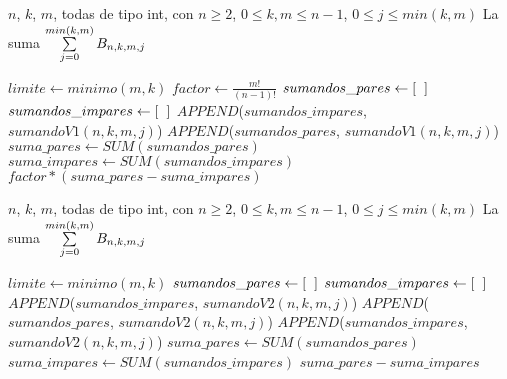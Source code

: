 \begin{algorithm}
\caption{$sumatoriaV1$}\label{alg: sumatoriaV1}
\begin{algorithmic} [1]
\REQUIRE $n$, $k$, $m$, todas de tipo int, con $n \geq 2$, 
$0 \leq k, m \leq n-1$, $0 \leq j \leq min(k,m)$
\ENSURE La suma $\sum\limits_{j=0}^{min(k,m)}B_{n, k, m, j}$

\STATE $limite \leftarrow minimo(m,k)$
\STATE $factor \leftarrow \frac{m!}{(n-1)!}$
\STATE $sumandos\_pares \leftarrow [ \hspace{0.2cm} ]$
\STATE $sumandos\_impares \leftarrow [ \hspace{0.2cm}]$
\STATE $APPEND$($sumandos\_impares$, $sumandoV1(n,k,m,j)$)
\ELSE
\STATE $APPEND$($sumandos\_pares$, $sumandoV1(n,k,m,j)$)
\ENDIF
\ENDFOR
\STATE $suma\_pares \leftarrow SUM(sumandos\_pares)$
\STATE $suma\_impares \leftarrow SUM(sumandos\_impares)$
\RETURN $factor * (suma\_pares - suma\_impares)$
\end{algorithmic}
\end{algorithm}

\begin{algorithm}
\caption{$sumatoriaV2$}\label{alg: sumatoriaV2}
\begin{algorithmic} [1]
\REQUIRE $n$, $k$, $m$, todas de tipo int, con $n \geq 2$, 
$0 \leq k, m \leq n-1$, $0 \leq j \leq min(k,m)$
\ENSURE La suma $\sum\limits_{j=0}^{min(k,m)}B_{n, k, m, j}$

\STATE $limite \leftarrow minimo(m,k)$
\STATE $sumandos\_pares \leftarrow [ \hspace{0.2cm} ]$
\STATE $sumandos\_impares \leftarrow [\hspace{0.2cm} ]$
\STATE $APPEND$($sumandos\_impares$, $sumandoV2(n,k,m,j)$)
\ELSE
\STATE $APPEND$($sumandos\_pares$, $sumandoV2(n,k,m,j)$)
\ENDIF
\ENDFOR
{} 
\STATE $APPEND$($sumandos\_impares$, $sumandoV2(n,k,m,j)$)
\ENDFOR
\STATE $suma\_pares \leftarrow SUM(sumandos\_pares)$
\STATE $suma\_impares \leftarrow SUM(sumandos\_impares)$
\RETURN $suma\_pares - suma\_impares$
\end{algorithmic}
\end{algorithm}


